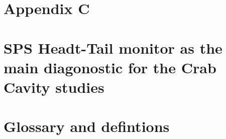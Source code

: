 \documentclass[12pt,twoside]{report} %
\begin{document}
\chapter{Appendix C}\label{ch:app_C}

\chapter{SPS Headt-Tail monitor as the main diagonostic for the Crab Cavity studies}\label{ch:app_HT_monitor}


\chapter{Glossary and defintions}


\backmatter
\printbibliography
{}
\end{document}
